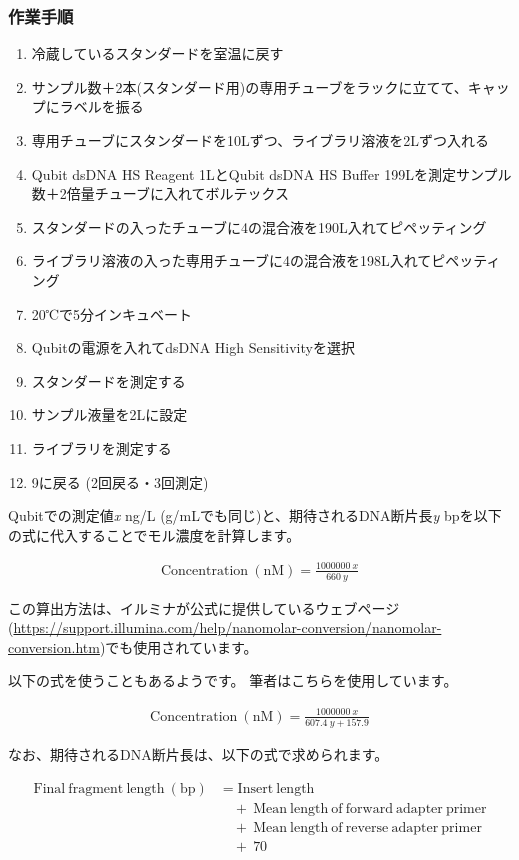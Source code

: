 \documentclass[titlepage,10pt,a4paper,uplatex]{jsbook}
\begin{document}
\subsubsection{作業手順}
\begin{enumerate}
\item 冷蔵しているスタンダードを室温に戻す
\item サンプル数＋2本(スタンダード用)の専用チューブをラックに立てて、キャップにラベルを振る
\item 専用チューブにスタンダードを10{\textmu}Lずつ、ライブラリ溶液を2{\textmu}Lずつ入れる
\item Qubit dsDNA HS Reagent 1{\textmu}LとQubit dsDNA HS Buffer 199{\textmu}Lを測定サンプル数＋2倍量チューブに入れてボルテックス
\item スタンダードの入ったチューブに4の混合液を190{\textmu}L入れてピペッティング
\item ライブラリ溶液の入った専用チューブに4の混合液を198{\textmu}L入れてピペッティング
\item 20℃で5分インキュベート
\item Qubitの電源を入れてdsDNA High Sensitivityを選択
\item スタンダードを測定する
\item サンプル液量を2{\textmu}Lに設定
\item ライブラリを測定する
\item 9に戻る (2回戻る・3回測定)
\end{enumerate}

Qubitでの測定値\textit{x} ng/{\textmu}L ({\textmu}g/mLでも同じ)と、期待されるDNA断片長\textit{y} bpを以下の式に代入することでモル濃度を計算します。

\begin{align*}
\mathrm{Concentration~(nM)} = \frac{1000000\ x}{660\ y}
\end{align*}

この算出方法は、イルミナが公式に提供しているウェブページ(\url{https://support.illumina.com/help/nanomolar-conversion/nanomolar-conversion.htm})でも使用されています。

以下の式を使うこともあるようです。
筆者はこちらを使用しています。

\begin{align*}
\mathrm{Concentration~(nM)} = \frac{1000000\ x}{607.4\ y + 157.9}
\end{align*}

なお、期待されるDNA断片長は、以下の式で求められます。

\begin{align*}
\mathrm{Final~fragment~length~(bp)} &= \mathrm{Insert~length} \\
            &\quad + \ \mathrm{Mean~length~of~forward~adapter~primer} \\
            &\quad + \ \mathrm{Mean~length~of~reverse~adapter~primer} \\
            &\quad + \ 70
\end{align*}
\end{document}
